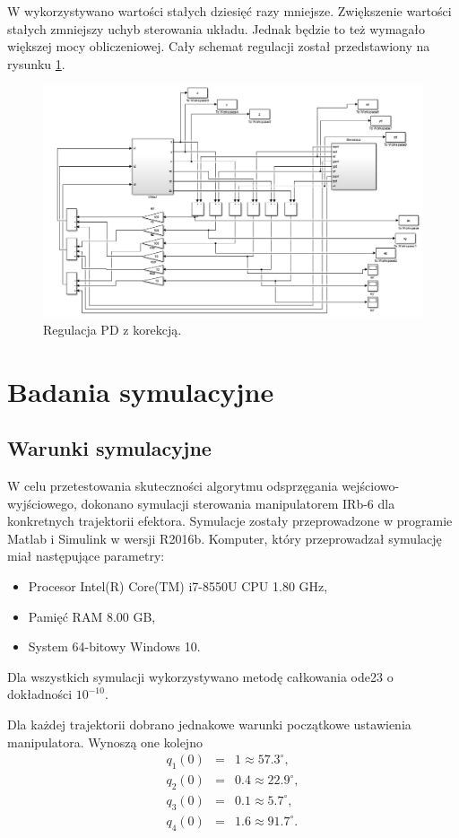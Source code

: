 \documentclass[eng,printmode]{mgr}
\begin{document}
W \cite{b1} wykorzystywano wartości stałych dziesięć razy mniejsze. Zwiększenie wartości stałych zmniejszy uchyb sterowania układu. Jednak będzie to też wymagało większej mocy obliczeniowej.
Cały schemat regulacji został przedstawiony na rysunku \ref{fig:blok8}.
\begin{figure}[ht]
\centering
\includegraphics[width=1\textwidth]{13.png}
\caption{\label{fig:blok8}Regulacja PD z korekcją.}
\end{figure}
\chapter{Badania symulacyjne}
\section{Warunki symulacyjne}
W celu przetestowania skuteczności algorytmu odsprzęgania wejściowo-wyjściowego, dokonano symulacji sterowania manipulatorem IRb-6 dla konkretnych trajektorii efektora. Symulacje zostały przeprowadzone w programie Matlab i Simulink w wersji R2016b. Komputer, który przeprowadzał symulację miał następujące parametry:
\begin{itemize}
\item Procesor Intel(R) Core(TM) i7-8550U CPU 1.80 GHz,
\item Pamięć RAM 8.00 GB,
\item System 64-bitowy Windows 10.
\end{itemize}


Dla wszystkich symulacji wykorzystywano metodę całkowania ode23 o dokładności $10^{-10}$. 

Dla każdej trajektorii dobrano jednakowe warunki początkowe ustawienia manipulatora. Wynoszą one kolejno
\begin{eqnarray}
q_1(0)&=&1\approx 57.3^{\circ},\\ \nonumber
q_2(0)&=&0.4\approx 22.9^{\circ},\\ \nonumber
q_3(0)&=&0.1\approx 5.7^{\circ},\\ \nonumber
q_4(0)&=&1.6\approx 91.7^{\circ}. \nonumber
\end{eqnarray}
\end{document}
